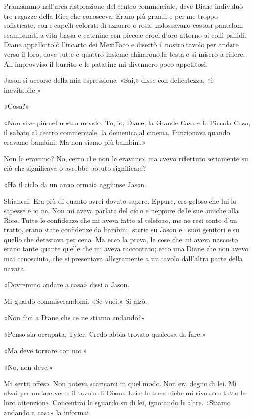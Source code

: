 Pranzammo nell'area ristorazione del centro commerciale, dove Diane
individuò tre ragazze della Rice che conosceva. Erano più grandi e per
me troppo sofisticate, con i capelli colorati di azzurro o rosa,
indossavano costosi pantaloni scampanati a vita bassa e catenine con
piccole croci d'oro attorno ai colli pallidi. Diane appallottolò
l'incarto dei MexiTaco e disertò il nostro tavolo per andare verso il
loro, dove tutte e quattro insieme chinarono la testa e si misero a
ridere. All'improvviso il burrito e le patatine mi divennero poco
appetitosi.

Jason si accorse della mia espressione. «Sai,» disse con delicatezza, «è
inevitabile.»

«Cosa?»

«Non vive più nel nostro mondo. Tu, io, Diane, la Grande Casa e la
Piccola Casa, il sabato al centro commerciale, la domenica al cinema.
Funzionava quando eravamo bambini. Ma non siamo più bambini.»

Non lo eravamo? No, certo che non lo eravamo, ma avevo riflettuto
seriamente su ciò che significava o avrebbe potuto significare?

«Ha il ciclo da un anno ormai» aggiunse Jason.

Sbiancai. Era più di quanto avrei dovuto sapere. Eppure, ero geloso che
lui lo sapesse e io no. Non mi aveva parlato del ciclo e neppure delle
sue amiche alla Rice. Tutte le confidenze che mi aveva fatto al
telefono, me ne resi conto d'un tratto, erano state confidenze da
bambini, storie su Jason e i suoi genitori e su quello che detestava per
cena. Ma ecco la prova, le cose che mi aveva nascosto erano tante quante
quelle che mi aveva raccontato; ecco una Diane che non avevo mai
conosciuto, che si presentava allegramente a un tavolo dall'altra parte
della navata.

«Dovremmo andare a casa» dissi a Jason.

Mi guardò commiserandomi. «Se vuoi.» Si alzò.

«Non dici a Diane che ce ne stiamo andando?»

«Penso sia occupata, Tyler. Credo abbia trovato qualcosa da fare.»

«Ma deve tornare con noi.»

«No, non deve.»

Mi sentii offeso. Non poteva scaricarci in quel modo. Non era degno di
lei. Mi alzai per andare verso il tavolo di Diane. Lei e le tre amiche
mi rivolsero tutta la loro attenzione. Concentrai lo sguardo su di lei,
ignorando le altre. «Stiamo andando a casa» la informai.

